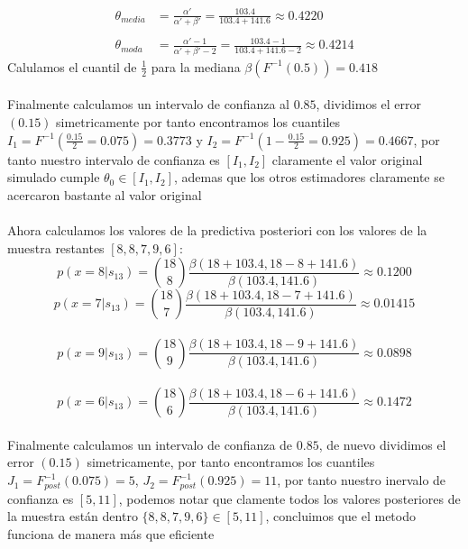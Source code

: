 \documentclass[11pt,letterpaper]{article}
\begin{document}
\begin{align*}
    \theta_{media}&=\frac{\alpha'}{\alpha'+\beta'}=\frac{103.4}{103.4+141.6}\approx0.4220\,\\
    \,\\
    \theta_{moda}&=\frac{\alpha'-1}{\alpha'+\beta'-2}=\frac{103.4-1}{103.4+141.6-2}\approx0.4214
\end{align*}
Calulamos el cuantil de $\frac{1}{2}$ para la mediana $\beta(F^{-1}(0.5))=0.418$\,\\
\,\\
Finalmente calculamos un intervalo de confianza al $0.85$, dividimos el error $(0.15)$ simetricamente por tanto encontramos los cuantiles
$I_1=F^{-1}(\frac{0.15}{2}=0.075)=0.3773$ y $I_2=F^{-1}(1-\frac{0.15}{2}=0.925)=0.4667$, por tanto nuestro intervalo de confianza es $[I_1,I_2]$ claramente el valor original
simulado cumple $\theta_0\in[I_1,I_2]$, ademas que los otros estimadores claramente se acercaron bastante al valor original\,\\
\,\\
Ahora calculamos los valores de la predictiva posteriori con los valores de la muestra restantes $[8,8,7,9,6]$:\,\\
\begin{equation*}
    p(x=8|s_{13})=\binom{18}{8}\frac{\beta(18+103.4,18-8+141.6)}{\beta(103.4,141.6)}\approx0.1200
\end{equation*}
\begin{equation*}
    p(x=7|s_{13})=\binom{18}{7}\frac{\beta(18+103.4,18-7+141.6)}{\beta(103.4,141.6)}\approx0.01415
\end{equation*}\,\\
\begin{equation*}
    p(x=9|s_{13})=\binom{18}{9}\frac{\beta(18+103.4,18-9+141.6)}{\beta(103.4,141.6)}\approx0.0898
\end{equation*}\,\\
\begin{equation*}
    p(x=6|s_{13})=\binom{18}{6}\frac{\beta(18+103.4,18-6+141.6)}{\beta(103.4,141.6)}\approx0.1472
\end{equation*}\,\\
Finalmente calculamos un intervalo de confianza de $0.85$, de nuevo dividimos el error $(0.15)$ simetricamente, por tanto encontramos los cuantiles
$J_1=F^{-1}_{post}(0.075)=5$, $J_2=F^{-1}_{post}(0.925)=11$, por tanto nuestro inervalo de confianza es $[5,11]$, podemos notar que clamente todos los valores
posteriores de la muestra est\'an dentro $\{8,8,7,9,6\}\in[5,11]$, concluimos que el metodo funciona de manera m\'as que eficiente
\end{document}
